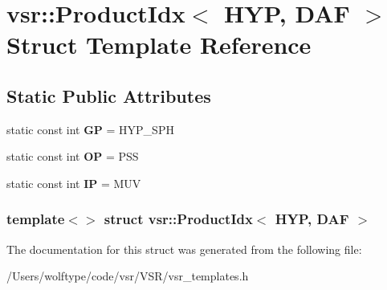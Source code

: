 \hypertarget{structvsr_1_1_product_idx_3_01_h_y_p_00_01_d_a_f_01_4}{\section{vsr\-:\-:Product\-Idx$<$ H\-Y\-P, D\-A\-F $>$ Struct Template Reference}
\label{structvsr_1_1_product_idx_3_01_h_y_p_00_01_d_a_f_01_4}
}
\subsection*{Static Public Attributes}
\begin{DoxyCompactItemize}
\item 
\hypertarget{structvsr_1_1_product_idx_3_01_h_y_p_00_01_d_a_f_01_4_ade81b885ec8fd9c9e9ea8ec804e43eb2}{static const int {\bfseries G\-P} = H\-Y\-P\-\_\-\-S\-P\-H}\label{structvsr_1_1_product_idx_3_01_h_y_p_00_01_d_a_f_01_4_ade81b885ec8fd9c9e9ea8ec804e43eb2}

\item 
\hypertarget{structvsr_1_1_product_idx_3_01_h_y_p_00_01_d_a_f_01_4_ab2bd6d11f58a8988bdbc7f09cf587814}{static const int {\bfseries O\-P} = P\-S\-S}\label{structvsr_1_1_product_idx_3_01_h_y_p_00_01_d_a_f_01_4_ab2bd6d11f58a8988bdbc7f09cf587814}

\item 
\hypertarget{structvsr_1_1_product_idx_3_01_h_y_p_00_01_d_a_f_01_4_a51404fbc6b6088e3dfda7d3bc530eac6}{static const int {\bfseries I\-P} = M\-U\-V}\label{structvsr_1_1_product_idx_3_01_h_y_p_00_01_d_a_f_01_4_a51404fbc6b6088e3dfda7d3bc530eac6}

\end{DoxyCompactItemize}
\subsubsection*{template$<$$>$ struct vsr\-::\-Product\-Idx$<$ H\-Y\-P, D\-A\-F $>$}



The documentation for this struct was generated from the following file\-:\begin{DoxyCompactItemize}
\item 
/\-Users/wolftype/code/vsr/\-V\-S\-R/vsr\-\_\-templates.\-h\end{DoxyCompactItemize}
